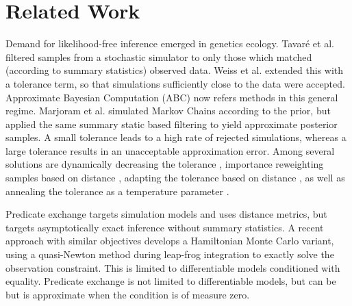 \section{Related Work}

Demand for likelihood-free inference emerged in genetics ecology.
Tavar{\'e} et al.  
filtered samples from a stochastic simulator to only those which matched (according to summary statistics) observed data. 
Weiss et al.  extended this with a tolerance term, so that simulations sufficiently close to the data were accepted.
Approximate Bayesian Computation (ABC) now refers methods \cite{beaumont2002approximate,sisson2007sequential} in this general regime.
Marjoram et al.  simulated Markov Chains according to the prior, but applied the same summary static based filtering to yield approximate posterior samples.
A small tolerance leads to a high rate of rejected simulations, whereas a large tolerance results in an unacceptable approximation error.
Among several solutions are dynamically decreasing the tolerance \cite{toni2008approximate}, importance reweighting samples based on distance \cite{wegmann2009efficient}, adapting the tolerance based on distance \cite{del2012adaptive,lenormand2013adaptive}, as well as annealing the tolerance as a temperature parameter \cite{albert2015simulated}.

Predicate exchange targets simulation models and uses distance metrics, but targets asymptotically exact inference without summary statistics.
A recent approach \cite{graham2017asymptotically}  with similar objectives develops a Hamiltonian Monte Carlo variant, using a quasi-Newton method during leap-frog integration to exactly solve the observation constraint.
This is limited to differentiable models conditioned with equality.
Predicate exchange is not limited to differentiable models, but can be but is approximate when the condition is of measure zero.


